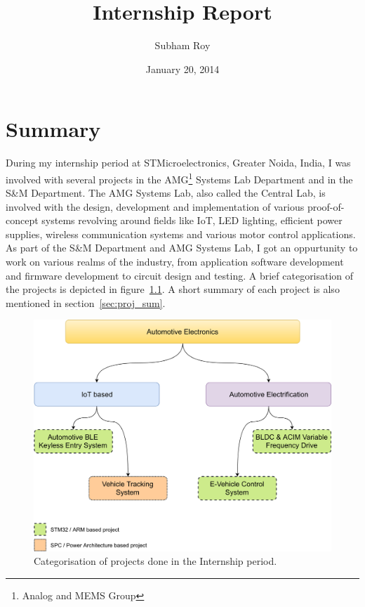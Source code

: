 \documentclass[]{book}
\title{Internship Report}
\author{Subham Roy}
\institute{PEC University of Technology}
\date{January 20, 2014}
\begin{document}
\maketitle

{
\hypersetup{linkcolor=black}
\setcounter{tocdepth}{2}
\tableofcontents
}
 \listoffigures

\chapter{Summary}\label{summary}

During my internship period at STMicroelectronics, Greater Noida, India,
I was involved with several projects in the AMG\footnote{Analog and MEMS Group}
Systems Lab Department and in the S\&M Department. The AMG Systems Lab,
also called the Central Lab, is involved with the design, development
and implementation of various proof-of-concept systems revolving around
fields like IoT, LED lighting, efficient power supplies, wireless
communication systems and various motor control applications. As part of
the S\&M Department and AMG Systems Lab, I got an oppurtunity to work on
various realms of the industry, from application software development
and firmware development to circuit design and testing. A brief
categorisation of the projects is depicted in
figure~\ref{fig:proj_categ}. A short summary of each project is also
mentioned in section~\ref{sec:proj_sum}.

\begin{figure}
\centering
\includegraphics{img/proj_categ.png}
\caption{Categorisation of projects done in the Internship
period.}\label{fig:proj_categ}
\end{figure}
\end{document}
